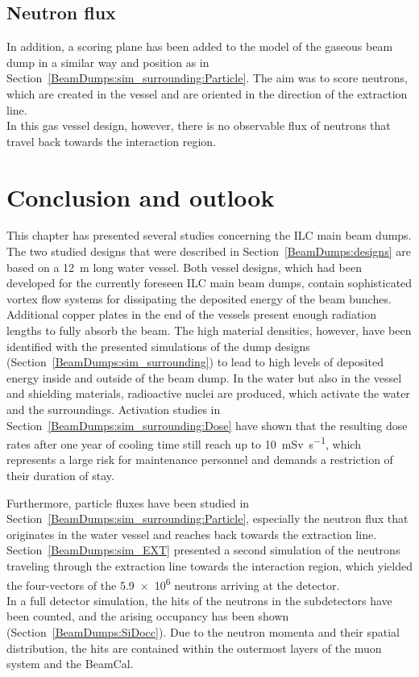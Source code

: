 \subsection{Neutron flux}
In addition, a scoring plane has been added to the \fluka model of the gaseous beam dump in a similar way and position as in Section~\ref{BeamDumps:sim_surrounding:Particle}.
The aim was to score neutrons, which are created in the vessel and are oriented in the direction of the extraction line.
\\In this gas vessel design, however, there is no observable flux of neutrons that travel back towards the interaction region.

\section{Conclusion and outlook}
This chapter has presented several studies concerning the ILC main beam dumps.
The two studied designs that were described in Section~\ref{BeamDumps:designs} are based on a \SI{12}{\meter} long water vessel.
Both vessel designs, which had been developed for the currently foreseen ILC main beam dumps, contain sophisticated vortex flow systems for dissipating the deposited energy of the beam bunches.
Additional copper plates in the end of the vessels present enough radiation lengths to fully absorb the beam.
The high material densities, however, have been identified with the presented \fluka simulations of the dump designs (Section~\ref{BeamDumps:sim_surrounding}) to lead to high levels of deposited energy inside and outside of the beam dump.
In the water but also in the vessel and shielding materials, radioactive nuclei are produced, which activate the water and the surroundings.
Activation studies in Section~\ref{BeamDumps:sim_surrounding:Dose} have shown that the resulting dose rates after one year of cooling time still reach up to \SI{10}{\milli\sievert\per\second}, which represents a large risk for maintenance personnel and demands a restriction of their duration of stay.

Furthermore, particle fluxes have been studied in Section~\ref{BeamDumps:sim_surrounding:Particle}, especially the neutron flux that originates in the water vessel and reaches back towards the extraction line.
Section~\ref{BeamDumps:sim_EXT} presented a second \fluka simulation of the neutrons traveling through the extraction line towards the interaction region, which yielded the four-vectors of the \num{5.9e6} neutrons arriving at the \sid detector.
\\In a full \geant detector simulation, the hits of the neutrons in the \sid subdetectors have been counted, and the arising occupancy has been shown (Section~\ref{BeamDumps:SiDocc}).
Due to the neutron momenta and their spatial distribution, the hits are contained within the outermost layers of the \sid muon system and the BeamCal.

